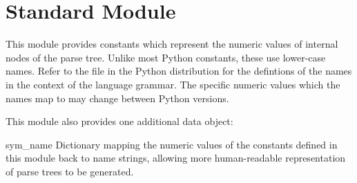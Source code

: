 \section{Standard Module }
\label{module-symbol}

This module provides constants which represent the numeric values of
internal nodes of the parse tree.  Unlike most Python constants, these
use lower-case names.  Refer to the file  in the
Python distribution for the defintions of the names in the context of
the language grammar.  The specific numeric values which the names map
to may change between Python versions.

This module also provides one additional data object:



\begin{datadesc}{sym_name}
Dictionary mapping the numeric values of the constants defined in this
module back to name strings, allowing more human-readable
representation of parse trees to be generated.
\end{datadesc}

\begin{seealso}
\end{seealso}
